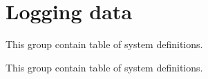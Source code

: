\hypertarget{group__matlab__scripts}{
\section{\-Logging data}
\label{group__matlab__scripts}
}


\-This group contain table of system definitions.  


\-This group contain table of system definitions. 